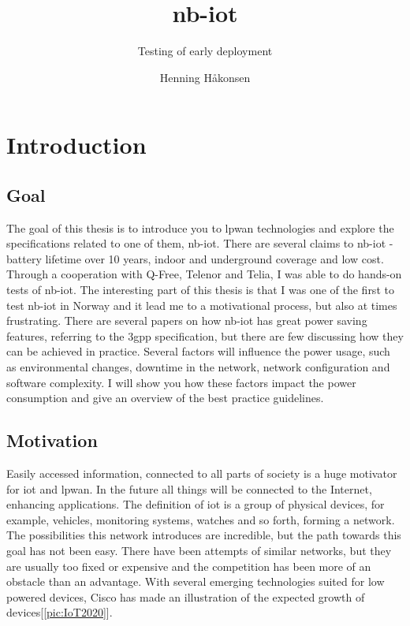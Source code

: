 \documentclass[USenglish]{ifimaster}  %
\title{\acrlong{nb-iot}}
\subtitle{Testing of early deployment}
\author{Henning Håkonsen}
\begin{document}
\frontmatter

\duoforside[dept={Department of Informatics},   %
  program={Network and system administration},  %
  long]                                        %

\tableofcontents

\newpage
\lstlistoflistings

\newpage
\listoffigures

\newpage
\listoftables

\cleardoublepage


\cleardoublepage


\mainmatter{}

\chapter{Introduction}
\section{Goal}
The goal of this thesis is to introduce you to \acrfull{lpwan} technologies and explore the specifications related to one of them, \acrfull{nb-iot}. There are several claims to \acrshort{nb-iot} - battery lifetime over 10 years, indoor and underground coverage and low cost. Through a cooperation with Q-Free, Telenor and Telia, I was able to do hands-on tests of \acrshort{nb-iot}. The interesting part of this thesis is that I was one of the first to test \acrshort{nb-iot} in Norway and it lead me to a motivational process, but also at times frustrating. There are several papers on how \acrshort{nb-iot} has great power saving features, referring to the \acrfull{3gpp} specification, but there are few discussing how they can be achieved in practice. Several factors will influence the power usage, such as environmental changes, downtime in the network, network configuration and software complexity. I will show you how these factors impact the power consumption and give an overview of the best practice guidelines.

\section{Motivation}
Easily accessed information, connected to all parts of society is a huge motivator for \acrfull{iot} and \acrshort{lpwan}. In the future all things will be connected to the Internet, enhancing applications. The definition of \acrshort{iot} is a group of physical devices, for example, vehicles, monitoring systems, watches and so forth, forming a network. The possibilities this network introduces are incredible, but the path towards this goal has not been easy. There have been attempts of similar networks, but they are usually too fixed or expensive and the competition has been more of an obstacle than an advantage. With several emerging technologies suited for low powered devices, Cisco has made an illustration of the expected growth of devices[\vref{pic:IoT2020}].
\end{document}

